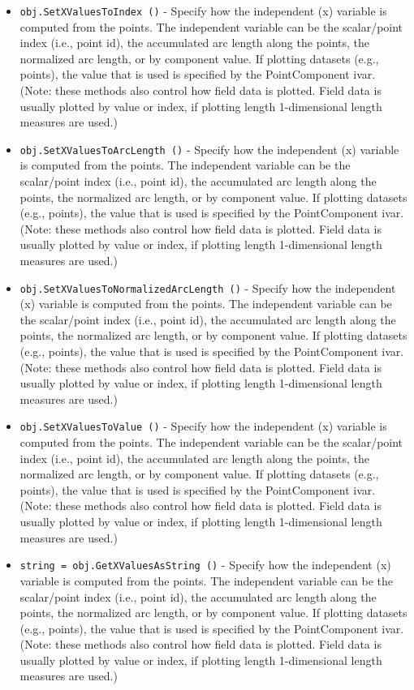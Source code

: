 \begin{itemize}
\item  \verb|obj.SetXValuesToIndex ()| -  Specify how the independent (x) variable is computed from the points.
 The independent variable can be the scalar/point index (i.e., point id),
 the accumulated arc length along the points, the normalized arc length,
 or by component value. If plotting datasets (e.g., points), the value
 that is used is specified by the PointComponent ivar.  (Note: these
 methods also control how field data is plotted. Field data is usually
 plotted by value or index, if plotting length 1-dimensional length
 measures are used.)

\item  \verb|obj.SetXValuesToArcLength ()| -  Specify how the independent (x) variable is computed from the points.
 The independent variable can be the scalar/point index (i.e., point id),
 the accumulated arc length along the points, the normalized arc length,
 or by component value. If plotting datasets (e.g., points), the value
 that is used is specified by the PointComponent ivar.  (Note: these
 methods also control how field data is plotted. Field data is usually
 plotted by value or index, if plotting length 1-dimensional length
 measures are used.)

\item  \verb|obj.SetXValuesToNormalizedArcLength ()| -  Specify how the independent (x) variable is computed from the points.
 The independent variable can be the scalar/point index (i.e., point id),
 the accumulated arc length along the points, the normalized arc length,
 or by component value. If plotting datasets (e.g., points), the value
 that is used is specified by the PointComponent ivar.  (Note: these
 methods also control how field data is plotted. Field data is usually
 plotted by value or index, if plotting length 1-dimensional length
 measures are used.)

\item  \verb|obj.SetXValuesToValue ()| -  Specify how the independent (x) variable is computed from the points.
 The independent variable can be the scalar/point index (i.e., point id),
 the accumulated arc length along the points, the normalized arc length,
 or by component value. If plotting datasets (e.g., points), the value
 that is used is specified by the PointComponent ivar.  (Note: these
 methods also control how field data is plotted. Field data is usually
 plotted by value or index, if plotting length 1-dimensional length
 measures are used.)

\item  \verb|string = obj.GetXValuesAsString ()| -  Specify how the independent (x) variable is computed from the points.
 The independent variable can be the scalar/point index (i.e., point id),
 the accumulated arc length along the points, the normalized arc length,
 or by component value. If plotting datasets (e.g., points), the value
 that is used is specified by the PointComponent ivar.  (Note: these
 methods also control how field data is plotted. Field data is usually
 plotted by value or index, if plotting length 1-dimensional length
 measures are used.)


\end{itemize}
